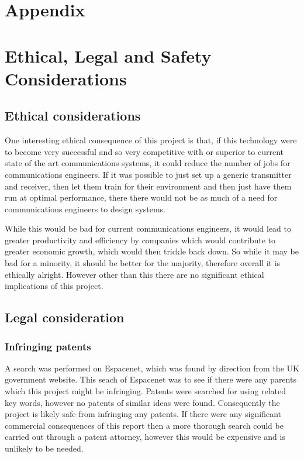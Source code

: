 \documentclass[12pt,onecolumn,letterpaper]{article}
\begin{document}
\FloatBarrier
\appendix
\section{Appendix}

\section{Ethical, Legal and Safety Considerations}

\subsection{Ethical considerations}

One interesting ethical consequence of this project is that, if this technology were to become very successful and so very competitive with or superior to current state of the art communications systems, it could reduce the number of jobs for communications engineers. If it was possible to just set up a generic transmitter and receiver, then let them train for their environment and then just have them run at optimal performance, there there would not be as much of a need for communications engineers to design systems.

While this would be bad for current communications engineers, it would lead to greater productivity and efficiency by companies which would contribute to greater economic growth, which would then trickle back down. So while it may be bad for a minority, it should be better for the majority, therefore overall it is ethically alright. However other than this there are no significant ethical implications of this project.

\subsection{Legal consideration}

\subsubsection{Infringing patents}

A search was performed on Espacenet, which was found by direction from the UK government website. This seach of Espacenet was to see if there were any parents which this project might be infringing. Patents were searched for using related key words, however no patents of similar ideas were found. Consequently the project is likely safe from infringing any patents. If there were any significant commercial consequences of this report then a more thorough search could be carried out through a patent attorney, however this would be expensive and is unlikely to be needed.
\end{document}
